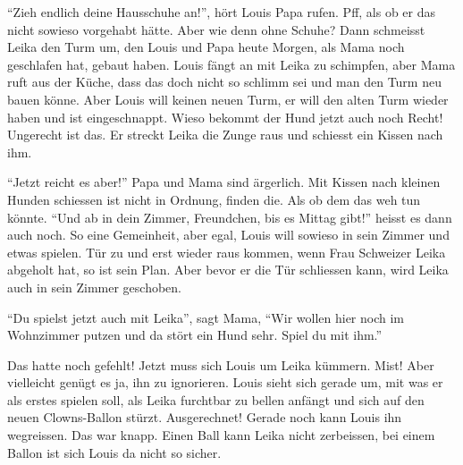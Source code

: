 \enquote{Zieh endlich deine Hausschuhe an!}, hört Louis Papa rufen. Pff, als ob er das nicht sowieso vorgehabt hätte. Aber wie denn ohne Schuhe? Dann schmeisst Leika den Turm um, den Louis und Papa heute Morgen, als Mama noch geschlafen hat, gebaut haben. Louis fängt an mit Leika zu schimpfen, aber Mama ruft aus der Küche, dass das doch nicht so schlimm sei und man den Turm neu bauen könne. Aber Louis will keinen neuen Turm, er will den alten Turm wieder haben und ist eingeschnappt. Wieso bekommt der Hund jetzt auch noch Recht! Ungerecht ist das. Er streckt Leika die Zunge raus und schiesst ein Kissen nach ihm.

\enquote{Jetzt reicht es aber!} Papa und Mama sind ärgerlich. Mit Kissen nach kleinen Hunden schiessen ist nicht in Ordnung, finden die. Als ob dem das weh tun könnte.
\enquote{Und ab in dein Zimmer, Freundchen, bis es Mittag gibt!} heisst es dann auch noch. So eine Gemeinheit, aber egal, Louis will sowieso in sein Zimmer und etwas spielen. Tür zu und erst wieder raus kommen, wenn Frau Schweizer Leika abgeholt hat, so ist sein Plan. Aber bevor er die Tür schliessen kann, wird Leika auch in sein Zimmer geschoben. 

\enquote{Du spielst jetzt auch mit Leika}, sagt Mama, \enquote{Wir wollen hier noch im Wohnzimmer putzen und da stört ein Hund sehr. Spiel du mit ihm.}

Das hatte noch gefehlt! Jetzt muss sich Louis um Leika kümmern. Mist! Aber vielleicht genügt es ja, ihn zu ignorieren. Louis sieht sich gerade um, mit was er als erstes spielen soll, als Leika furchtbar zu bellen anfängt und sich auf den neuen Clowns-Ballon stürzt. Ausgerechnet! Gerade noch kann Louis ihn wegreissen. Das war knapp. Einen Ball kann Leika nicht zerbeissen, bei einem Ballon ist sich Louis da nicht so sicher.

